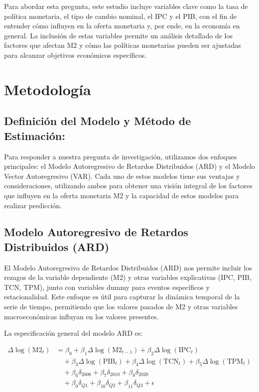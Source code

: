 \documentclass[
  12pt,
]{article}
\begin{document}
Para abordar esta pregunta, este estudio incluye variables clave como la
tasa de política monetaria, el tipo de cambio nominal, el IPC y el PIB,
con el fin de entender cómo influyen en la oferta monetaria y, por ende,
en la economía en general. La inclusión de estas variables permite un
análisis detallado de los factores que afectan M2 y cómo las políticas
monetarias pueden ser ajustadas para alcanzar objetivos económicos
específicos. \newpage

\section{Metodología}\label{metodologuxeda}

\subsection{Definición del Modelo y Método de
Estimación:}\label{definiciuxf3n-del-modelo-y-muxe9todo-de-estimaciuxf3n}

Para responder a nuestra pregunta de investigación, utilizamos dos
enfoques principales: el Modelo Autoregresivo de Retardos Distribuidos
(ARD) y el Modelo Vector Autoregresivo (VAR). Cada uno de estos modelos
tiene sus ventajas y consideraciones, utilizando ambos para obtener una
visión integral de los factores que influyen en la oferta monetaria M2 y
la capacidad de estos modelos para realizar predicción.

\subsection{Modelo Autoregresivo de Retardos Distribuidos
(ARD)}\label{modelo-autoregresivo-de-retardos-distribuidos-ard}

El Modelo Autoregresivo de Retardos Distribuidos (ARD) nos permite
incluir los rezagos de la variable dependiente (M2) y otras variables
explicativas (IPC, PIB, TCN, TPM), junto con variables dummy para
eventos específicos y estacionalidad. Este enfoque es útil para capturar
la dinámica temporal de la serie de tiempo, permitiendo que los valores
pasados de M2 y otras variables macroeconómicas influyan en los valores
presentes.

La especificación general del modelo ARD es:

\begin{align*}
\Delta \log(\text{M2}_t) &= \beta_0 + \beta_1 \Delta \log(\text{M2}_{t-1}) + \beta_2 \Delta \log(\text{IPC}_t) \\
&\quad + \beta_3 \Delta \log(\text{PIB}_t) + \beta_4 \Delta \log(\text{TCN}_t) + \beta_5 \Delta \log(\text{TPM}_t) \\
&\quad + \beta_6 \delta_{2008} + \beta_7 \delta_{2010} + \beta_8 \delta_{2020} \\
&\quad + \beta_9 \delta_{Q1} + \beta_{10} \delta_{Q2} + \beta_{11} \delta_{Q3} + \epsilon
\end{align*}
\end{document}
